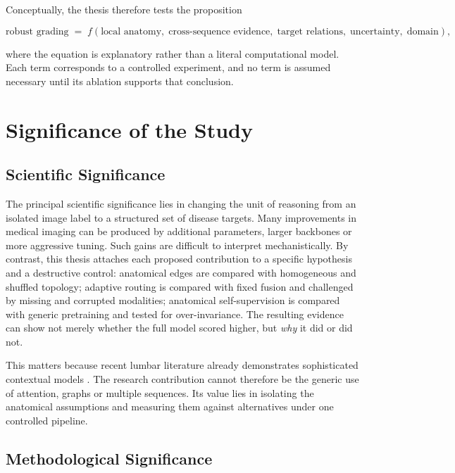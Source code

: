 Conceptually, the thesis therefore tests the proposition

\begin{equation}
\text{robust grading}
\;=\;
f(\text{local anatomy},\;\text{cross-sequence evidence},\;
\text{target relations},\;\text{uncertainty},\;\text{domain}),
\label{eq:intro-conceptual}
\end{equation}

where the equation is explanatory rather than a literal computational model. Each
term corresponds to a controlled experiment, and no term is assumed necessary until
its ablation supports that conclusion.

\section{Significance of the Study}
\label{sec:intro-significance}

\subsection{Scientific Significance}
\label{sec:intro-significance-scientific}

The principal scientific significance lies in changing the unit of reasoning from
an isolated image label to a structured set of disease targets. Many improvements in
medical imaging can be produced by additional parameters, larger backbones or more
aggressive tuning. Such gains are difficult to interpret mechanistically. By
contrast, this thesis attaches each proposed contribution to a specific hypothesis
and a destructive control: anatomical edges are compared with homogeneous and
shuffled topology; adaptive routing is compared with fixed fusion and challenged by
missing and corrupted modalities; anatomical self-supervision is compared with
generic pretraining and tested for over-invariance. The resulting evidence can show
not merely whether the full model scored higher, but \emph{why} it did or did not.

This matters because recent lumbar literature already demonstrates sophisticated
contextual models \cite{chai2026anatomy,batra2025mscan,nguyen2026crossspine}. The
research contribution cannot therefore be the generic use of attention, graphs or
multiple sequences. Its value lies in isolating the anatomical assumptions and
measuring them against alternatives under one controlled pipeline.

\subsection{Methodological Significance}
\label{sec:intro-significance-methodological}

